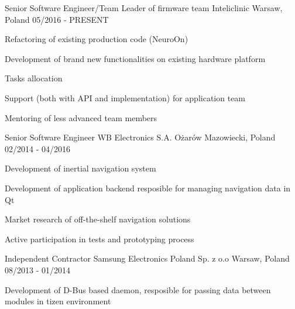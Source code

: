 

\begin{cventries}

  \cventry
    {Senior Software Engineer/Team Leader of firmware team} %
    {Inteliclinic} %
    {Warsaw, Poland} %
    {05/2016 - PRESENT} %
    {
      \begin{cvitems} %
      \item {Refactoring of existing production code (NeuroOn)}
      \item {Development of brand new functionalities on existing hardware platform}
      \item {Tasks allocation}
      \item {Support (both with API and implementation) for application team}
      \item {Mentoring of less advanced team members}
      \end{cvitems}
    }

  \cventry
    {Senior Software Engineer} %
    {WB Electronics S.A.} %
    {Ożarów Mazowiecki, Poland} %
    {02/2014 - 04/2016} %
    {
      \begin{cvitems} %
        \item {Development of inertial navigation system}
        \item {Development of application backend resposible for managing navigation data in Qt}
        \item {Market research of off-the-shelf navigation solutions}
        \item {Active participation in tests and prototyping process}
      \end{cvitems}
    }

  \cventry
    {Independent Contractor} %
    {Samsung Electronics Poland Sp. z o.o} %
    {Warsaw, Poland} %
    {08/2013 - 01/2014} %
    {
      \begin{cvitems} %
        \item {Development of D-Bus based daemon, resposible for passing data between modules in
          tizen environment}
      \end{cvitems}
    }


\end{cventries}
